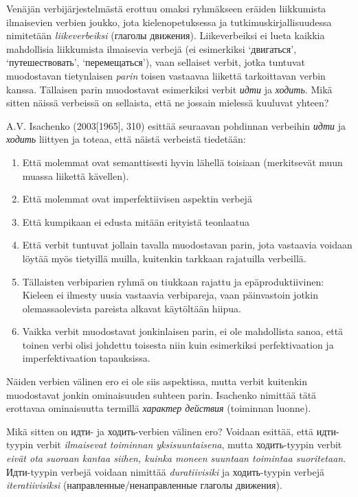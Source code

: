 \documentclass[]{scrartcl}
\providecommand{\tightlist}{%
  \setlength{\itemsep}{0pt}\setlength{\parskip}{0pt}}
\begin{document}
Venäjän verbijärjestelmästä erottuu omaksi ryhmäkseen eräiden
liikkumista ilmaisevien verbien joukko, jota kielenopetuksessa ja
tutkimuskirjallisuudessa nimitetään \emph{liikeverbeiksi} (глаголы
движения). Liikeverbeiksi ei lueta kaikkia mahdollisia liikkumista
ilmaisevia verbejä (ei esimerkiksi `двигаться', `путешествовать',
`перемещаться'), vaan sellaiset verbit, jotka tuntuvat muodostavan
tietynlaisen \emph{parin} toisen vastaavaa liikettä tarkoittavan verbin
kanssa. Tällaisen parin muodostavat esimerkiksi verbit \emph{идти} ja
\emph{ходить}. Mikä sitten näissä verbeissä on sellaista, että ne
jossain mielessä kuuluvat yhteen?

A.V. Isachenko (2003{[}1965{]}, 310) esittää seuraavan pohdinnan
verbeihin \emph{идти} ja \emph{ходить} liittyen ja toteaa, että näistä
verbeistä tiedetään:

\begin{enumerate}
\def\labelenumi{\arabic{enumi}.}
\tightlist
\item
  Että molemmat ovat semanttisesti hyvin lähellä toisiaan (merkitsevät
  muun muassa liikettä kävellen).
\item
  Että molemmat ovat imperfektiivisen aspektin verbejä
\item
  Että kumpikaan ei edusta mitään erityistä teonlaatua
\item
  Että verbit tuntuvat jollain tavalla muodostavan parin, jota vastaavia
  voidaan löytää myös tietyillä muilla, kuitenkin tarkkaan rajatuilla
  verbeillä.
\item
  Tällaisten verbiparien ryhmä on tiukkaan rajattu ja epäproduktiivinen:
  Kieleen ei ilmesty uusia vastaavia verbipareja, vaan päinvastoin
  jotkin olemassaolevista pareista alkavat käytöltään hiipua.
\item
  Vaikka verbit muodostavat jonkinlaisen parin, ei ole mahdollista
  sanoa, että toinen verbi olisi johdettu toisesta niin kuin esimerkiksi
  perfektivaation ja imperfektivaation tapauksissa.
\end{enumerate}

Näiden verbien välinen ero ei ole siis aspektissa, mutta verbit
kuitenkin muodostavat jonkin ominaisuuden suhteen parin. Isachenko
nimittää tätä erottavaa ominaisuutta termillä \emph{характер действия}
(toiminnan luonne).

Mikä sitten on идти- ja ходить-verbien välinen ero? Voidaan esittää,
että идти-tyypin verbit \emph{ilmaisevat toiminnan yksisuuntaisena},
mutta ходить-tyypin verbit \emph{eivät ota suoraan kantaa siihen, kuinka
moneen suuntaan toimintaa suoritetaan}. Идти-tyypin verbejä voidaan
nimittää \emph{duratiivisiki} ja ходить-tyypin verbejä
\emph{iteratiivisiksi} (направленные/ненаправленные глаголы движения).
\end{document}
